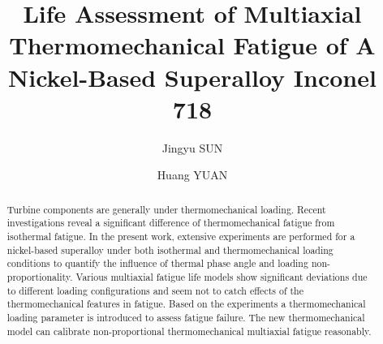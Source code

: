 \documentclass[preprint,5p,twocolumn,11pt,sort&compress]{elsarticle}
\begin{document}


\renewcommand\figureautorefname{Fig.}


\begin{frontmatter}



\title{Life Assessment of Multiaxial Thermomechanical Fatigue of A Nickel-Based Superalloy Inconel 718}


\author{Jingyu SUN}
\author{Huang YUAN}

\address[label1]{School of Aerospace Engineering, Tsinghua University, Beijing, China}
\address[label2]{Department of Civil Engineering, Technical University of Darmstadt, Germany}

\begin{abstract}
Turbine components are generally under thermomechanical loading. Recent investigations reveal a significant difference of thermomechanical fatigue from isothermal fatigue. In the present work, extensive experiments are performed for a nickel-based superalloy under both isothermal and thermomechanical loading conditions to quantify the influence of thermal phase angle and loading non-proportionality. Various multiaxial fatigue life models show significant deviations due to different loading configurations and seem not to catch effects of the thermomechanical features in fatigue. Based on the experiments a thermomechanical loading parameter is introduced to assess fatigue failure. The new thermomechanical model can calibrate non-proportional thermomechanical multiaxial fatigue reasonably.
\end{abstract}


\end{frontmatter}
\end{document}
